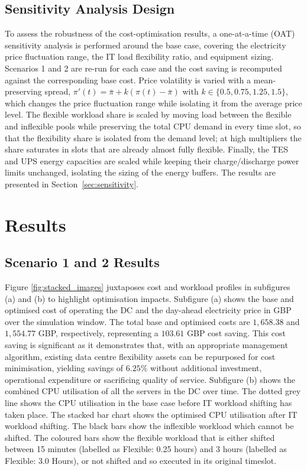\documentclass[lettersize,journal]{IEEEtran}
\newcommand{\rev}[1]{\textcolor{blue!70!black}{#1}}
\begin{document}
\subsection{\rev{Sensitivity Analysis Design}}\label{sec:sensitivity-design}
\rev{To assess the robustness of the cost-optimisation results, a one-at-a-time (OAT) sensitivity analysis is performed around the base case, covering the electricity price fluctuation range, the IT load flexibility ratio, and equipment sizing. Scenarios 1 and 2 are re-run for each case and the cost saving is recomputed against the corresponding base cost. Price volatility is varied with a mean-preserving spread, $\pi'(t) = \bar{\pi} + k(\pi(t)-\bar{\pi})$ with $k \in \{0.5, 0.75, 1.25, 1.5\}$, which changes the price fluctuation range while isolating it from the average price level. The flexible workload share is scaled by moving load between the flexible and inflexible pools while preserving the total CPU demand in every time slot, so that the flexibility share is isolated from the demand level; at high multipliers the share saturates in slots that are already almost fully flexible. Finally, the TES and UPS energy capacities are scaled while keeping their charge/discharge power limits unchanged, isolating the sizing of the energy buffers. The results are presented in Section~\ref{sec:sensitivity}.}
\section{Results}

\subsection{Scenario 1 and 2 Results}
Figure \ref{fig:stacked_images} juxtaposes cost and workload profiles in subfigures (a) and (b) to highlight optimisation impacts. Subfigure (a) shows the base and optimised cost of operating the DC and the day-ahead electricity price in GBP over the simulation window. \rev{The total base and optimised costs are $1,658.38$ and $1,554.77$ GBP, respectively, representing a $103.61$ GBP cost saving. This cost saving is significant as it demonstrates that, with an appropriate management algorithm, existing data centre flexibility assets can be repurposed for cost minimisation, yielding savings of $6.25\%$ without additional investment, operational expenditure or sacrificing quality of service.} Subfigure (b) shows the combined CPU utilisation of all the servers in the DC over time. The dotted grey line shows the CPU utilisation in the base case before IT workload shifting has taken place. The stacked bar chart shows the optimised CPU utilisation after IT workload shifting. The black bars show the inflexible workload which cannot be shifted. The coloured bars show the flexible workload that is either shifted between 15 minutes (labelled as Flexible: 0.25 hours) and 3 hours (labelled as Flexible: 3.0 Hours), or not shifted and so executed in its original timeslot. 
\end{document}
